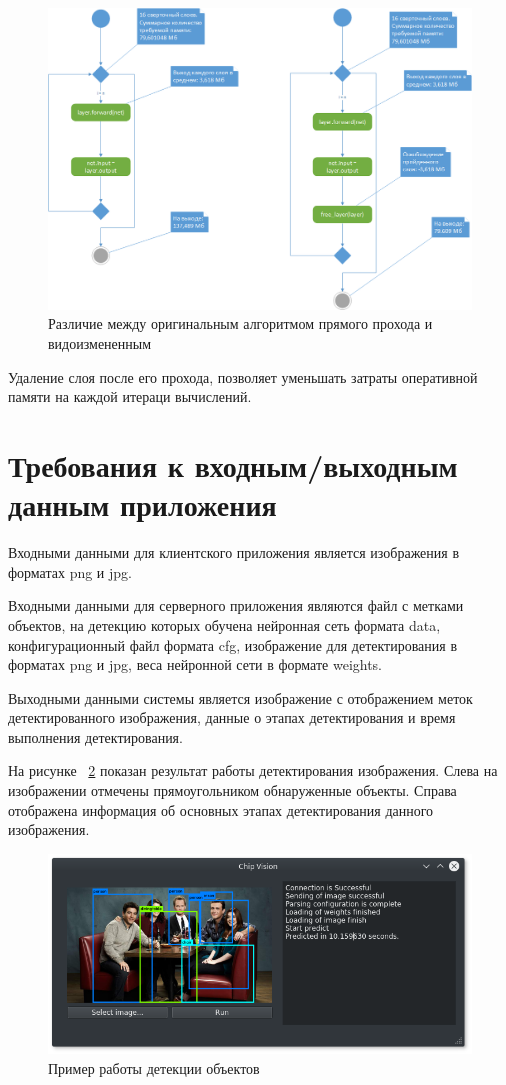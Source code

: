 \documentclass[a4paper,english,russian]{G2-105}
\begin{document}
\begin{figure}
    \includegraphics[width=0.9\linewidth]{alg.png}
    \caption{Различие между оригинальным алгоритмом прямого прохода и видоизмененным}
	\label{alg}
\end{figure}
\par Удаление слоя после его прохода, позволяет уменьшать затраты оперативной памяти на каждой итераци вычислений.
\ttl
\section{Требования к входным/выходным данным приложения}
\par Входными данными для клиентского приложения является изображения в форматах png и jpg.
\par Входными данными для серверного приложения являются файл с метками объектов, на детекцию которых обучена нейронная сеть формата data, конфигурационный файл формата cfg, изображение для детектирования в форматах png и jpg, веса нейронной сети в формате weights.
\par Выходными данными системы является изображение с отображением меток детектированного изображения, данные о этапах детектирования и время выполнения детектирования.
\par На рисунке ~\ref{window} показан результат работы детектирования изображения. Слева на изображении отмечены прямоугольником обнаруженные объекты. Справа отображена информация об основных этапах детектирования данного изображения.
\begin{figure}
    \includegraphics[width=\linewidth]{window.png}
    \caption{Пример работы детекции объектов}
	\label{window}
\end{figure}
\ttl
\end{document}
